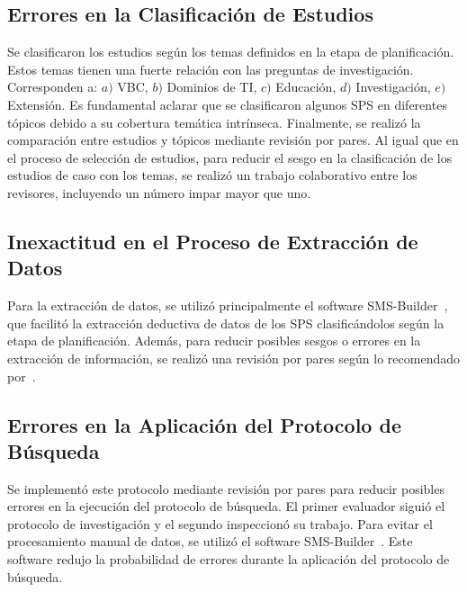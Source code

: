 \subsection{Errores en la Clasificación de Estudios}
Se clasificaron los estudios según los temas definidos en la etapa de planificación. Estos temas tienen una fuerte relación con las preguntas de investigación. Corresponden a: $a)$ VBC, $b)$ Dominios de TI, $c)$ Educación, $d)$ Investigación, $e)$ Extensión. Es fundamental aclarar que se clasificaron algunos SPS en diferentes tópicos debido a su cobertura temática intrínseca. Finalmente, se realizó la comparación entre estudios y tópicos mediante revisión por pares. Al igual que en el proceso de selección de estudios, para reducir el sesgo en la clasificación de los estudios de caso con los temas, se realizó un trabajo colaborativo entre los revisores, incluyendo un número impar mayor que uno.

\subsection{Inexactitud en el Proceso de Extracción de Datos}
Para la extracción de datos, se utilizó principalmente el software SMS-Builder~\cite{candela2020smsbuilder}, que facilitó la extracción deductiva de datos de los SPS clasificándolos según la etapa de planificación. Además, para reducir posibles sesgos o errores en la extracción de información, se realizó una revisión por pares según lo recomendado por~\cite{Kitchenham2010}.

\subsection{Errores en la Aplicación del Protocolo de Búsqueda}
Se implementó este protocolo mediante revisión por pares para reducir posibles errores en la ejecución del protocolo de búsqueda. El primer evaluador siguió el protocolo de investigación y el segundo inspeccionó su trabajo. Para evitar el procesamiento manual de datos, se utilizó el software SMS-Builder~\cite{candela2020smsbuilder}. Este software redujo la probabilidad de errores durante la aplicación del protocolo de búsqueda.